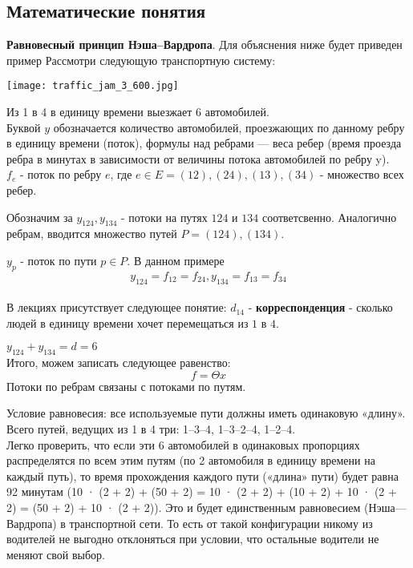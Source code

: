 \documentclass{article}
\begin{document}
\subsection{Математические понятия}

\textbf{Равновесный принцип Нэша–Вардропа}. Для объяснения ниже будет приведен пример
Рассмотри следующую транспортную систему:

\texttt{[image: traffic\_jam\_3\_600.jpg]}

Из 1 в 4 в единицу времени выезжает 6 автомобилей.\\

Буквой $y$ обозначается количество автомобилей, проезжающих по данному ребру в единицу времени (поток), формулы над ребрами — веса ребер (время проезда ребра в минутах в зависимости от величины потока автомобилей по ребру y).\\

$f_e$ - поток по ребру $e$, где $e \in E = {(12), (24), (13), (34)}$ - множество всех ребер.

Обозначим за $y_{124}, y_{134}$ - потоки на путях $124$ и $134$ соответсвенно.
Аналогично ребрам, вводится множество путей $P = {(124), (134)}$.

$y_p$ - поток по пути $p \in P$.
В данном примере $$y_{124} = f_{12} = f_{24}, y_{134} = f_{13} = f_{34}$$\\

В лекциях присутствует следующее понятие:
$d_{14}$ - \textbf{корреспонденция} - сколько людей в единицу времени хочет перемещаться из $1$ в $4$.

$y_{124} + y_{134} = d = 6$ \\
Итого, можем записать следующее равенство: $$f = \Theta x$$
Потоки по ребрам связаны с потоками по путям.

Условие равновесия: все используемые пути должны иметь одинаковую «длину». Всего путей, ведущих из 1 в 4 три: 1–3–4, 1–3–2–4, 1–2–4.\\

Легко проверить, что если эти 6 автомобилей в одинаковых пропорциях распределятся по всем этим путям (по 2 автомобиля в единицу времени на каждый путь), то время прохождения каждого пути («длина» пути) будет равна 92 минутам (10 · (2 + 2) + (50 + 2) = 10 · (2 + 2) + (10 + 2) + 10 · (2 + 2) = (50 + 2) + 10 · (2 + 2)). Это и будет единственным равновесием (Нэша—Вардропа) в транспортной сети. То есть от такой конфигурации никому из водителей не выгодно отклоняться при условии, что остальные водители не меняют свой выбор.\\
\end{document}
